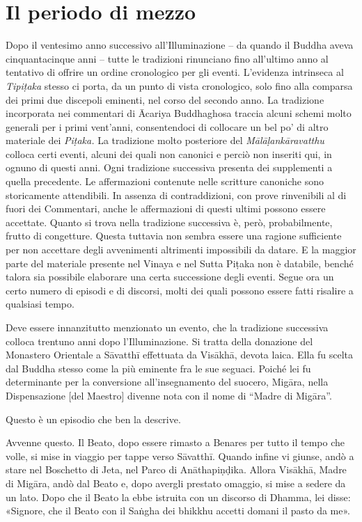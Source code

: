 \chapter{Il periodo di mezzo}

 Dopo il ventesimo anno successivo all’Illuminazione
– da quando il Buddha aveva cinquantacinque anni – tutte le tradizioni
rinunciano fino all’ultimo anno al tentativo di offrire un ordine cronologico
per gli eventi. L’evidenza intrinseca al \emph{Tipiṭaka} stesso ci porta, da un
punto di vista cronologico, solo fino alla comparsa dei primi due discepoli
eminenti, nel corso del secondo anno. La tradizione incorporata nei commentari
di Ācariya Buddhaghosa traccia alcuni schemi molto generali per i primi
vent’anni, consentendoci di collocare un bel po’ di altro materiale dei
\emph{Piṭaka.} La tradizione molto posteriore del \emph{Mālāḷankāravatthu}
colloca certi eventi, alcuni dei quali non canonici e perciò non inseriti qui,
in ognuno di questi anni. Ogni tradizione successiva presenta dei supplementi a
quella precedente. Le affermazioni contenute nelle scritture canoniche sono
storicamente attendibili. In assenza di contraddizioni, con prove rinvenibili al
di fuori dei Commentari, anche le affermazioni di questi ultimi possono essere
accettate. Quanto si trova nella tradizione successiva è, però, probabilmente,
frutto di congetture. Questa tuttavia non sembra essere una ragione sufficiente
per non accettare degli avvenimenti altrimenti impossibili da datare. E la
maggior parte del materiale presente nel Vinaya e nel Sutta Piṭaka non è
databile, benché talora sia possibile elaborare una certa successione degli
eventi. Segue ora un certo numero di episodi e di discorsi, molti dei quali
possono essere fatti risalire a qualsiasi tempo.

 Deve essere innanzitutto menzionato un evento, che
la tradizione successiva colloca trentuno anni dopo l’Illuminazione. Si tratta
della donazione del Monastero Orientale a Sāvatthī effettuata da Visākhā, devota
laica. Ella fu scelta dal Buddha stesso come la più eminente fra le sue seguaci.
Poiché lei fu determinante per la conversione all’insegnamento del suocero,
Migāra, nella Dispensazione [del Maestro] divenne nota con il nome di “Madre di
Migāra”.

 Questo è un episodio che ben la descrive.

 Avvenne questo. Il Beato, dopo essere rimasto a Benares
per tutto il tempo che volle, si mise in viaggio per tappe verso Sāvatthī.
Quando infine vi giunse, andò a stare nel Boschetto di Jeta, nel Parco di
Anāthapiṇḍika. Allora Visākhā, Madre di Migāra, andò dal Beato e, dopo avergli
prestato omaggio, si mise a sedere da un lato. Dopo che il Beato la ebbe
istruita con un discorso di Dhamma, lei disse: «Signore, che il Beato con il
Saṅgha dei bhikkhu accetti domani il pasto da me».

